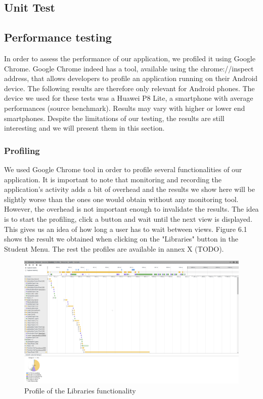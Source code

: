 \documentclass{eplmastersthesis}
\begin{document}
\subsection{Unit Test}

\subsection{Performance testing}
In order to assess the performance of our application, we profiled it using Google Chrome. Google Chrome indeed has a tool, available using the chrome://inspect address, that allows developers to profile an application running on their Android device. The following results are therefore only relevant for Android phones. The device we used for these tests was a Huawei P8 Lite, a smartphone with average performances (source benchmark). Results may vary with higher or lower end smartphones. Despite the limitations of our testing, the results are still interesting and we will present them in this section.
\subsubsection{Profiling}
We used Google Chrome tool in order to profile several functionalities of our application. It is important to note that monitoring and recording the application's activity adds a bit of overhead and the results we show here will be slightly worse than the ones one would obtain without any monitoring tool. However, the overhead is not important enough to invalidate the results. The idea is to start the profiling, click a button and wait until the next view is displayed. This gives us an idea of how long a user has to wait between views. Figure 6.1 shows the result we obtained when clicking on the "Libraries" button in the Student Menu. The rest the profiles are available in annex X (TODO).

\begin{figure}[H]
\centering
\includegraphics[scale = 0.25]{Images/libraries.png}
\caption{Profile of the Libraries functionality}
\end{figure}
\end{document}
